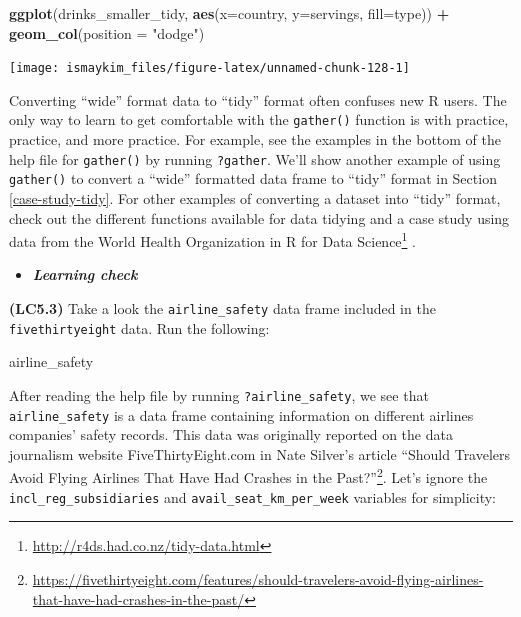 \documentclass[12pt, krantz2,]{krantz}
\makeatletter
\newenvironment{Shaded}{\begin{snugshade}}{\end{snugshade}}
\newcommand{\DataTypeTok}[1]{\textcolor[rgb]{0.27,0.27,0.27}{#1}}
\newcommand{\KeywordTok}[1]{\textcolor[rgb]{0.27,0.27,0.27}{\textbf{#1}}}
\newcommand{\NormalTok}[1]{#1}
\newcommand{\OperatorTok}[1]{\textcolor[rgb]{0.43,0.43,0.43}{\textbf{#1}}}
\newcommand{\StringTok}[1]{\textcolor[rgb]{0.5,0.5,0.5}{#1}}
\renewcommand{\href}[2]{#2\footnote{\url{#1}}}
\newenvironment{kframe}{%
\medskip{}
\setlength{\fboxsep}{.8em}
 \def\at@end@of@kframe{}%
 \ifinner\ifhmode%
  \def\at@end@of@kframe{\end{minipage}}%
  \begin{minipage}{\columnwidth}%
 \fi\fi%
 \def\FrameCommand##1{\hskip\@totalleftmargin \hskip-\fboxsep
 \colorbox{shadecolor}{##1}\hskip-\fboxsep
     \hskip-\linewidth \hskip-\@totalleftmargin \hskip\columnwidth}%
 \MakeFramed {\advance\hsize-\width
   \@totalleftmargin\z@ \linewidth\hsize
   \@setminipage}}%
 {\par\unskip\endMakeFramed%
 \at@end@of@kframe}
\renewenvironment{Shaded}{\begin{kframe}}{\end{kframe}}
\newenvironment{rmdblock}[1]
  {\begin{shaded*}
  \begin{itemize}
  \renewcommand{\labelitemi}{
    \raisebox{-.7\height}[0pt][0pt]{
    }
  }
  \item
  }
  {
  \end{itemize}
  \end{shaded*}
  }
\newenvironment{learncheck}
  {\begin{rmdblock}{warning}}
  {\end{rmdblock}}
\makeatother
\begin{document}
\begin{Shaded}
\begin{Highlighting}[]
\KeywordTok{ggplot}\NormalTok{(drinks_smaller_tidy, }\KeywordTok{aes}\NormalTok{(}\DataTypeTok{x=}\NormalTok{country, }\DataTypeTok{y=}\NormalTok{servings, }\DataTypeTok{fill=}\NormalTok{type)) }\OperatorTok{+}
\StringTok{  }\KeywordTok{geom_col}\NormalTok{(}\DataTypeTok{position =} \StringTok{"dodge"}\NormalTok{)}
\end{Highlighting}
\end{Shaded}

\begin{center}\texttt{[image: ismaykim\_files/figure-latex/unnamed-chunk-128-1]} \end{center}

Converting ``wide'' format data to ``tidy'' format often confuses new R users. The only way to learn to get comfortable with the \texttt{gather()} function is with practice, practice, and more practice. For example, see the examples in the bottom of the help file for \texttt{gather()} by running \texttt{?gather}. We'll show another example of using \texttt{gather()} to convert a ``wide'' formatted data frame to ``tidy'' format in Section \ref{case-study-tidy}. For other examples of converting a dataset into ``tidy'' format, check out the different functions available for data tidying and a case study using data from the World Health Organization in \href{http://r4ds.had.co.nz/tidy-data.html}{R for Data Science} \citep{rds2016}.

\begin{learncheck}
\textbf{\emph{Learning check}}
\end{learncheck}

\textbf{(LC5.3)} Take a look the \texttt{airline\_safety} data frame included in the \texttt{fivethirtyeight} data. Run the following:

\begin{Shaded}
\begin{Highlighting}[]
\NormalTok{airline_safety}
\end{Highlighting}
\end{Shaded}

After reading the help file by running \texttt{?airline\_safety}, we see that \texttt{airline\_safety} is a data frame containing information on different airlines companies' safety records. This data was originally reported on the data journalism website FiveThirtyEight.com in Nate Silver's article \href{https://fivethirtyeight.com/features/should-travelers-avoid-flying-airlines-that-have-had-crashes-in-the-past/}{``Should Travelers Avoid Flying Airlines That Have Had Crashes in the Past?''}. Let's ignore the \texttt{incl\_reg\_subsidiaries} and \texttt{avail\_seat\_km\_per\_week} variables for simplicity:
\end{document}
